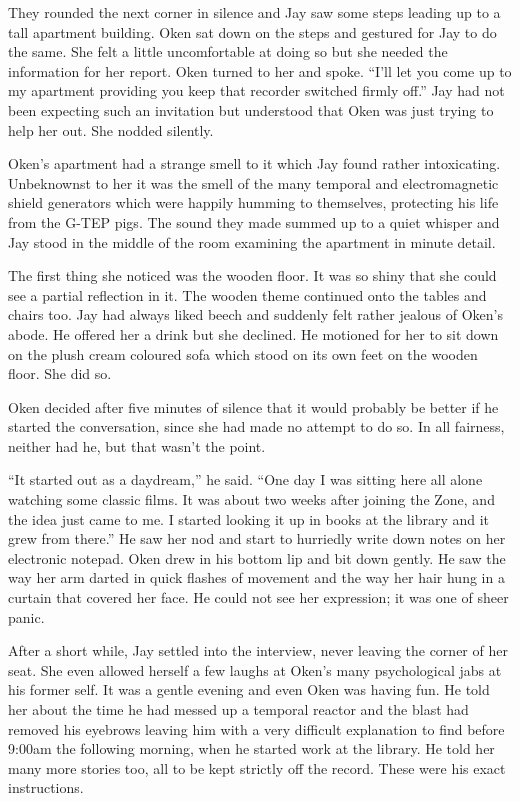 They rounded the next corner in silence and Jay saw some steps leading up to a tall apartment building. Oken sat down on the steps and gestured for Jay to do the same. She felt a little uncomfortable at doing so but she needed the information for her report. Oken turned to her and spoke. ``I'll let you come up to my apartment providing you keep that recorder switched firmly off.'' Jay had not been expecting such an invitation but understood that Oken was just trying to help her out. She nodded silently.

\thoughtbreak

Oken's apartment had a strange smell to it which Jay found rather intoxicating. Unbeknownst to her it was the smell of the many temporal and electromagnetic shield generators which were happily humming to themselves, protecting his life from the G-TEP pigs. The sound they made summed up to a quiet whisper and Jay stood in the middle of the room examining the apartment in minute detail.

The first thing she noticed was the wooden floor. It was so shiny that she could see a partial reflection in it. The wooden theme continued onto the tables and chairs too. Jay had always liked beech and suddenly felt rather jealous of Oken's abode. He offered her a drink but she declined. He motioned for her to sit down on the plush cream coloured sofa which stood on its own feet on the wooden floor. She did so.

Oken decided after five minutes of silence that it would probably be better if he started the conversation, since she had made no attempt to do so. In all fairness, neither had he, but that wasn't the point.

``It started out as a daydream,'' he said. ``One day I was sitting here all alone watching some classic films. It was about two weeks after joining the Zone, and the idea just came to me. I started looking it up in books at the library and it grew from there.'' He saw her nod and start to hurriedly write down notes on her electronic notepad. Oken drew in his bottom lip and bit down gently. He saw the way her arm darted in quick flashes of movement and the way her hair hung in a curtain that covered her face. He could not see her expression; it was one of sheer panic.

After a short while, Jay settled into the interview, never leaving the corner of her seat. She even allowed herself a few laughs at Oken's many psychological jabs at his former self. It was a gentle evening and even Oken was having fun. He told her about the time he had messed up a temporal reactor and the blast had removed his eyebrows leaving him with a very difficult explanation to find before 9:00am the following morning, when he started work at the library. He told her many more stories too, all to be kept strictly off the record. These were his exact instructions.

